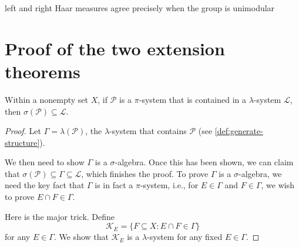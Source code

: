 left and right Haar measures agree precisely when the group is unimodular

\section{Proof of the two extension theorems} \label{sec:ext-thm-proof}

\begin{namedthm}
     Within a nonempty set $X$, if $\mathcal{P}$ is a $\pi$-system that is contained in a $\lambda$-system $\mathcal{L}$, then $\sigma(\mathcal{P})\subseteq\mathcal{L}$.
\end{namedthm}
\begin{proof}
Let $\Gamma = \lambda(\mathcal P)$, the $\lambda$-system that contains $\mathcal{P}$ (see \cref{def:generate-structure}). 

We then need to show $\Gamma$ is a $\sigma$-algebra. Once this has been shown, we can claim that $\sigma(\mathcal{P})\subseteq\Gamma\subseteq\mathcal L$, which finishes the proof. To prove $\Gamma$ is a $\sigma$-algebra, we need the key fact that $\Gamma$ is in fact a
$\pi$-system, i.e., for $E\in\Gamma$ and $F\in\Gamma$, we wish
to prove $E\cap F\in\Gamma$.

Here is the major trick. Define
\begin{equation}
    \mathcal K_{E}=\{F\subseteq X:E\cap F\in\Gamma\} \label{eq:def-collect-pi-lambda}
\end{equation}
for any $E\in\Gamma$. We show that $\mathcal K_{E}$ is a $\lambda$-system for any fixed $E\in\Gamma$.


\end{proof}
